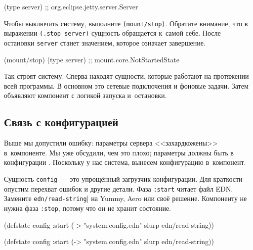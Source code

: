 \begin{english}
  \begin{clojure}
(type server)
;; org.eclipse.jetty.server.Server
  \end{clojure}
\end{english}

Чтобы выключить систему, выполните \verb|(mount/stop)|. Обратите внимание, что
в выражении \verb|(.stop server)| сущность обращается к~самой себе. После
остановки \verb|server| станет значением, которое означает завершение.

\begin{english}
  \begin{clojure}
(mount/stop)
(type server)
;; mount.core.NotStartedState
  \end{clojure}
\end{english}

Так строят систему. Сперва находят сущности, которые работают на протяжении всей
программы. В основном это сетевые подключения и фоновые задачи. Затем объявляют
компонент с логикой запуска и~остановки.

\subsection{Связь с конфигурацией}

Выше мы допустили ошибку: параметры сервера <<захардкожены>> в~компоненте. Мы
уже обсудили, чем это плохо; параметры должны быть в
конфигурации . Поскольку у нас система, вынесем конфигурацию
в~компонент.


Сущность \verb|config|~--- это упрощённый загрузчик конфигурации. Для краткости
опустим перехват ошибок и другие детали. Фаза \verb|:start| читает файл
EDN. Замените \texttt{edn/read\--string}| на Yummy, Aero или своё
решение. Компоненту не нужна фаза \verb|:stop|, потому что он не хранит
состояние.

\ifx\DEVICETYPE\MOBILE

\begin{english}
  \begin{clojure}
(defstate config
  :start
  (-> "system.config.edn"
      slurp
      edn/read-string))
  \end{clojure}
\end{english}

\else

\begin{english}
  \begin{clojure}
(defstate config
  :start
  (-> "system.config.edn" slurp edn/read-string))
  \end{clojure}
\end{english}

